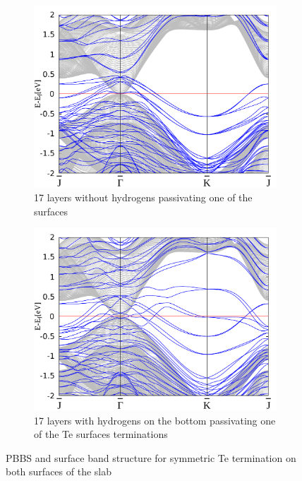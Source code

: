 \begin{figure}[htbp]
\begin{subfigure}[c]{.48\linewidth}
			\includegraphics[width=\linewidth]{Te_termination/no_H_bulk+17_layers_no_dos_-2_2.pdf}
			\caption{17 layers without hydrogens passivating one of the surfaces} 
		\end{subfigure}
		\hfill
		\begin{subfigure}[c]{.48\linewidth}
			\centering
			\includegraphics[width=\linewidth]{Te_termination/bulk+17_layers_no_dos_-2_2.pdf}
			\caption{17 layers with hydrogens on the bottom passivating one of the Te surfaces terminations}
		\end{subfigure}
		\caption{PBBS and surface band structure for symmetric Te termination on both surfaces of the slab} 
		\label{bulk+surface_odd_layers_Te}
	\end{figure}

